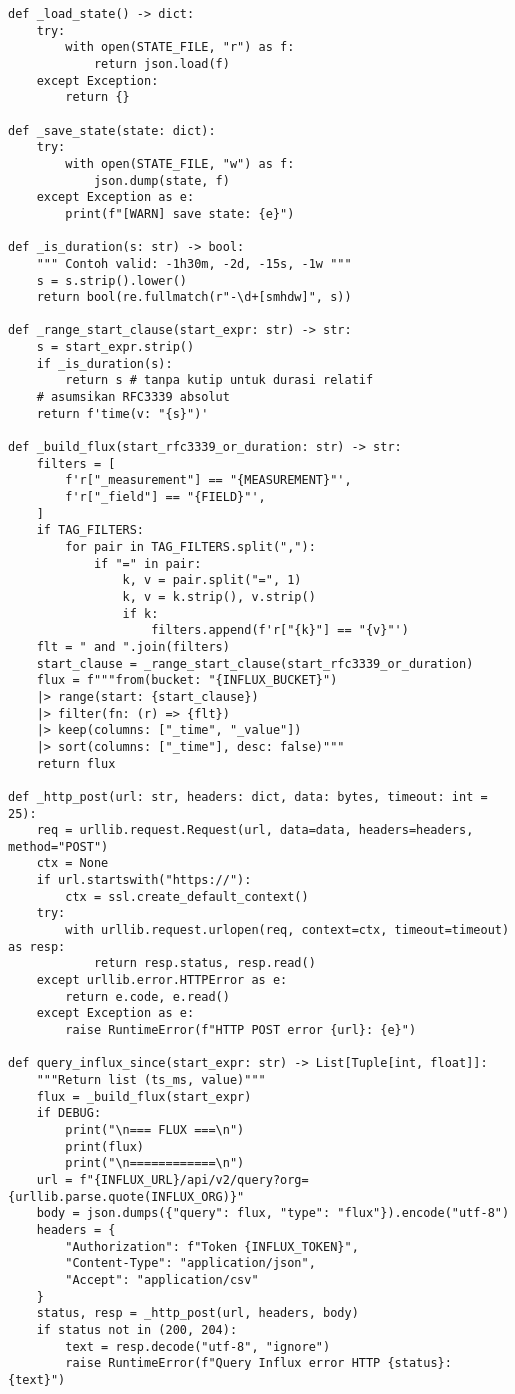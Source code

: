 \documentclass[a4paper, 12pt]{article}
\begin{document}
\begin{lstlisting}[style=pythonstyle, caption={InfluxDB DWSIM dan Kirim ke Thingsboard (python)}]
def _load_state() -> dict:
    try:
        with open(STATE_FILE, "r") as f:
            return json.load(f)
    except Exception:
        return {}

def _save_state(state: dict):
    try:
        with open(STATE_FILE, "w") as f:
            json.dump(state, f)
    except Exception as e:
        print(f"[WARN] save state: {e}")

def _is_duration(s: str) -> bool:
    """ Contoh valid: -1h30m, -2d, -15s, -1w """
    s = s.strip().lower()
    return bool(re.fullmatch(r"-\d+[smhdw]", s))

def _range_start_clause(start_expr: str) -> str:
    s = start_expr.strip()
    if _is_duration(s):
        return s # tanpa kutip untuk durasi relatif
    # asumsikan RFC3339 absolut
    return f'time(v: "{s}")'

def _build_flux(start_rfc3339_or_duration: str) -> str:
    filters = [
        f'r["_measurement"] == "{MEASUREMENT}"',
        f'r["_field"] == "{FIELD}"',
    ]
    if TAG_FILTERS:
        for pair in TAG_FILTERS.split(","):
            if "=" in pair:
                k, v = pair.split("=", 1)
                k, v = k.strip(), v.strip()
                if k:
                    filters.append(f'r["{k}"] == "{v}"')
    flt = " and ".join(filters)
    start_clause = _range_start_clause(start_rfc3339_or_duration)
    flux = f"""from(bucket: "{INFLUX_BUCKET}")
    |> range(start: {start_clause})
    |> filter(fn: (r) => {flt})
    |> keep(columns: ["_time", "_value"])
    |> sort(columns: ["_time"], desc: false)"""
    return flux

def _http_post(url: str, headers: dict, data: bytes, timeout: int = 25):
    req = urllib.request.Request(url, data=data, headers=headers, method="POST")
    ctx = None
    if url.startswith("https://"):
        ctx = ssl.create_default_context()
    try:
        with urllib.request.urlopen(req, context=ctx, timeout=timeout) as resp:
            return resp.status, resp.read()
    except urllib.error.HTTPError as e:
        return e.code, e.read()
    except Exception as e:
        raise RuntimeError(f"HTTP POST error {url}: {e}")

def query_influx_since(start_expr: str) -> List[Tuple[int, float]]:
    """Return list (ts_ms, value)"""
    flux = _build_flux(start_expr)
    if DEBUG:
        print("\n=== FLUX ===\n")
        print(flux)
        print("\n============\n")
    url = f"{INFLUX_URL}/api/v2/query?org={urllib.parse.quote(INFLUX_ORG)}"
    body = json.dumps({"query": flux, "type": "flux"}).encode("utf-8")
    headers = {
        "Authorization": f"Token {INFLUX_TOKEN}",
        "Content-Type": "application/json",
        "Accept": "application/csv"
    }
    status, resp = _http_post(url, headers, body)
    if status not in (200, 204):
        text = resp.decode("utf-8", "ignore")
        raise RuntimeError(f"Query Influx error HTTP {status}: {text}")
    

\end{lstlisting}
\end{document}
